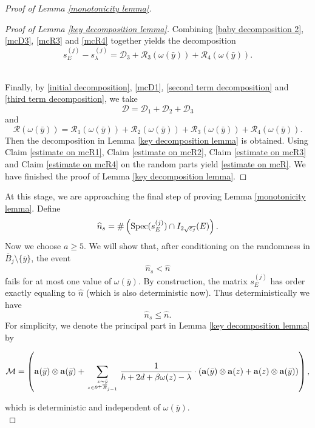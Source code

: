 \documentclass[11pt,reqno,UTF8,twoside]{amsart}
\newcommand{\spec}{{\rm Spec}}
\newcommand{\bfa}{\mathbf{a}}
\newcommand{\mcD}{\mathcal{D}}
\newcommand{\mcR}{\mathcal{R}}
\newcommand{\mcM}{\mathcal{M}}
\newcommand{\whn}{\widehat{n}}
\newcommand{\barB}{\overline{B}}
\newcommand{\smallSj}{s^{(j)}}
\theoremstyle{definition}
\numberwithin{equation}{section}
\begin{document}
\begin{proof}[Proof of Lemma \ref{monotonicity lemma}]
\begin{proof}[Proof of Lemma \ref{key decomposition lemma}]
Combining \eqref{baby decomposition 2}, \eqref{mcD3}, \eqref{mcR3} and \eqref{mcR4} together  yields the decomposition
\begin{equation}\label{third term decomposition}
  \smallSj_E-\smallSj_{\lambda} = \mcD_3+\mcR_3(\omega(\bar{y}))+\mcR_4(\omega(\bar{y})).
\end{equation}





 \\

\noindent Finally, by \eqref{initial decomposition}, \eqref{mcD1}, \eqref{second term decomposition} and \eqref{third term decomposition}, we take 
\[\mcD=\mcD_1+\mcD_2+\mcD_3\]
and 
\[\mcR(\omega(\bar{y}))= \mcR_1(\omega(\bar{y}))+\mcR_2(\omega(\bar{y}))+\mcR_3(\omega(\bar{y}))+\mcR_4(\omega(\bar{y})).\]
Then the decomposition in Lemma \ref{key decomposition lemma} is obtained. Using Claim \ref{estimate on mcR1}, Claim \ref{estimate on mcR2}, Claim \ref{estimate on mcR3} and Claim \ref{estimate on mcR4} on the random parts  yield \eqref{estimate on mcR}. We have finished  the proof of Lemma \ref{key decomposition lemma}.
\end{proof}


At this stage, we are approaching the final step  of proving Lemma \ref{monotonicity lemma}. Define 
\begin{equation*}
  \whn_s=\#\left(   \spec(\smallSj_E) \cap I_{2\sqrt{\varepsilon_j}}(E)   \right).
\end{equation*}
Now we choose $a\geq 5$. We will show that, after conditioning on the randomness in $\barB_{j}\setminus \{\bar{y}\}$, the event
\begin{equation}\label{immediate monotonicity}
  \whn_s <\whn 
\end{equation}
fails for at most one value of $\omega(\bar{y})$. By construction, the matrix $\smallSj_E$ has order exactly equaling  to $\whn$ (which is also deterministic now). Thus deterministically we have
\[\whn_s\leq \whn.\]
For simplicity, we denote the principal part in Lemma \ref{key decomposition lemma} by 
{\small

\[  \mcM =\left(\bfa(\bar{y})\otimes \bfa(\bar{y})+ \sum_{z\sim \bar{y} \atop z\in \partial^+\barB_{j-1}} \frac{1}{h+2d+\beta\omega(z)-\lambda } \cdot(\bfa(\bar{y}) \otimes  \bfa(z)+\bfa(z)\otimes\bfa(\bar{y})  )\right), \]
}
which is deterministic and independent of $\omega(\bar{y})$.\\



\end{proof}
\end{document}
